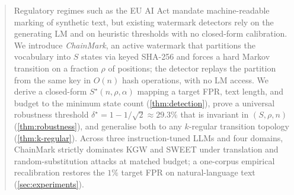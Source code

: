 \begin{abstract}
  Regulatory regimes such as the EU AI Act mandate machine-readable
  marking of synthetic text, but existing watermark detectors rely on
  the generating LM and on heuristic thresholds with no closed-form
  calibration. We introduce \emph{ChainMark}, an active
  watermark that partitions the vocabulary into $S$ states via keyed
  SHA-256 and forces a hard Markov transition on a fraction $\rho$ of
  positions; the detector replays the partition from the same key in
  $O(n)$ hash operations, with no LM access. We derive a closed-form
  $S^\star(n, \rho, \alpha)$ mapping a target FPR, text length, and
  budget to the minimum state count (\autoref{thm:detection}), prove a
  universal robustness threshold $\delta^\star = 1 - 1/\sqrt{2}
  \approx 29.3\%$ that is invariant in $(S,\rho,n)$
  (\autoref{thm:robustness}), and generalise both to any $k$-regular
  transition topology (\autoref{thm:k-regular}). Across three
  instruction-tuned LLMs and four domains, ChainMark strictly dominates
  KGW and SWEET under translation and random-substitution attacks at
  matched budget; a one-corpus empirical recalibration restores
  the $1\%$ target FPR on natural-language text
  (\autoref{sec:experiments}).
\end{abstract}
